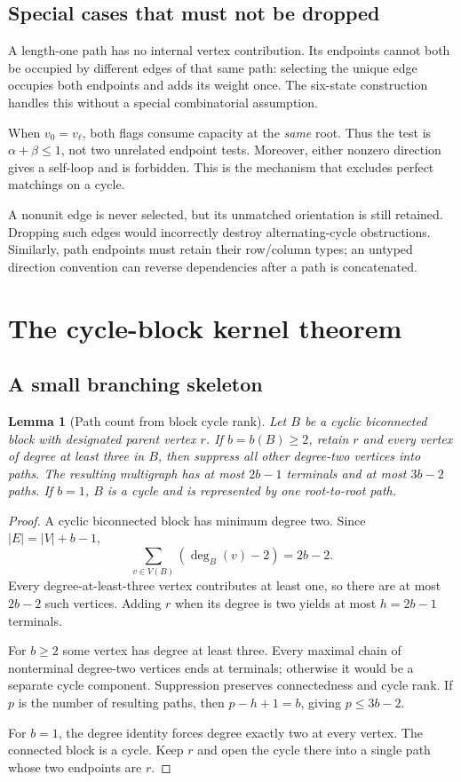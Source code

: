 \documentclass[11pt,letterpaper]{article}
\newtheorem{lemma}[lemma]{Lemma}\aliascntresetthe{lemma}
\theoremstyle{definition}
\theoremstyle{remark}
\begin{document}
\subsection{Special cases that must not be dropped}
A length-one path has no internal vertex contribution. Its endpoints cannot both be occupied by different edges of that same path: selecting the unique edge occupies both endpoints and adds its weight once. The six-state construction handles this without a special combinatorial assumption.

When $v_0=v_\ell$, both flags consume capacity at the \emph{same} root. Thus the test is $\alpha+\beta\le1$, not two unrelated endpoint tests. Moreover, either nonzero direction gives a self-loop and is forbidden. This is the mechanism that excludes perfect matchings on a cycle.

A nonunit edge is never selected, but its unmatched orientation is still retained. Dropping such edges would incorrectly destroy alternating-cycle obstructions. Similarly, path endpoints must retain their row/column types; an untyped direction convention can reverse dependencies after a path is concatenated.

\section{The cycle-block kernel theorem}
\label{sec:main}

\subsection{A small branching skeleton}
\begin{lemma}[Path count from block cycle rank]
\label{lem:pathcount}
Let $B$ be a cyclic biconnected block with designated parent vertex $r$. If $b=b(B)\ge2$, retain $r$ and every vertex of degree at least three in $B$, then suppress all other degree-two vertices into paths. The resulting multigraph has at most $2b-1$ terminals and at most $3b-2$ paths. If $b=1$, $B$ is a cycle and is represented by one root-to-root path.
\end{lemma}
\begin{proof}
A cyclic biconnected block has minimum degree two. Since $|E|=|V|+b-1$,
\[
 \sum_{v\in V(B)}(\deg_B(v)-2)=2b-2.
\]
Every degree-at-least-three vertex contributes at least one, so there are at most $2b-2$ such vertices. Adding $r$ when its degree is two yields at most $h=2b-1$ terminals.

For $b\ge2$ some vertex has degree at least three. Every maximal chain of nonterminal degree-two vertices ends at terminals; otherwise it would be a separate cycle component. Suppression preserves connectedness and cycle rank. If $p$ is the number of resulting paths, then $p-h+1=b$, giving $p\le3b-2$.

For $b=1$, the degree identity forces degree exactly two at every vertex. The connected block is a cycle. Keep $r$ and open the cycle there into a single path whose two endpoints are $r$.
\end{proof}
\end{document}
